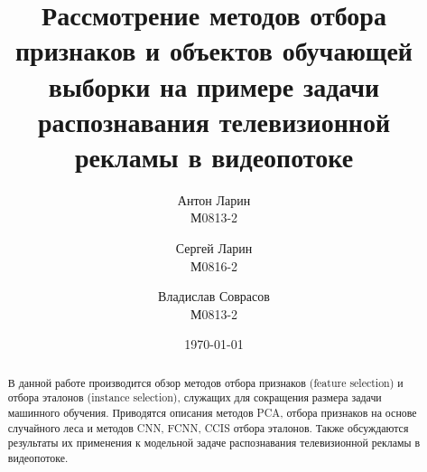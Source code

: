 \documentclass[a4paper]{article}
\begin{document}
\title{Рассмотрение методов отбора признаков и объектов обучающей выборки на примере задачи распознавания телевизионной рекламы в видеопотоке}
\author{Антон Ларин\\ М0813-2 \and Сергей Ларин\\ М0816-2 \and Владислав Соврасов\\ М0813-2}
\date{\today}
\maketitle

\begin{abstract}
В данной работе производится обзор методов отбора признаков (feature selection) и отбора эталонов (instance selection), служащих для сокращения размера задачи машинного обучения. Приводятся описания методов PCA, отбора признаков на основе случайного леса и методов CNN, FCNN, CCIS отбора эталонов. Также обсуждаются результаты их применения к модельной задаче распознавания телевизионной рекламы в видеопотоке.
\end{abstract}






\newpage
\printbibliography
\end{document}
